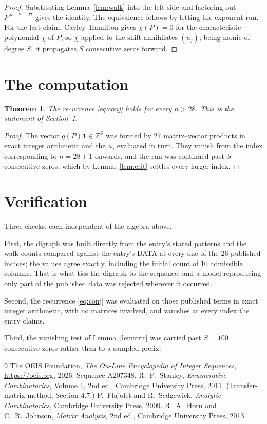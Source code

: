 \documentclass[11pt,a4paper]{article}
\theoremstyle{plain}
\newtheorem{theorem}{Theorem}
\theoremstyle{definition}
\begin{document}
\begin{proof}
Substituting Lemma~\ref{lem:walk} into the left side and factoring out
$P^{\,n-2-27}$ gives the identity. The equivalence follows by letting the exponent
run. For the last claim, Cayley--Hamilton gives $\chi(P)=0$ for the characteristic
polynomial $\chi$ of $P$, so $\chi$ applied to the shift annihilates $(u_j)$; being monic of
degree $S$, it propagates $S$ consecutive zeros forward.
\end{proof}

\section{The computation}

\begin{theorem}
The recurrence \eqref{eq:conj} holds for every $n>28$. This is the statement of
Section~1.
\end{theorem}

\begin{proof}
The vector $q(P)\mathbf{1}\in\mathbb{Z}^{S}$ was formed by $27$ matrix--vector
products in exact integer arithmetic and the $u_j$ evaluated in turn. They vanish from the
index corresponding to $n=28+1$ onwards, and the run was continued past $S$ consecutive
zeros, which by Lemma~\ref{lem:crit} settles every larger index.
\end{proof}

\section{Verification}

Three checks, each independent of the algebra above.

First, the digraph was built directly from the entry's stated patterns and the walk counts
compared against the entry's DATA at every one of the $26$ published indices; the
values agree exactly, including the initial count of $10$ admissible columns. That is
what ties the digraph to the sequence, and a model reproducing only part of the published
data was rejected wherever it occurred.

Second, the recurrence \eqref{eq:conj} was evaluated on those published terms in exact
integer arithmetic, with no matrices involved, and vanishes at every index the entry claims.

Third, the vanishing test of Lemma~\ref{lem:crit} was carried past $S=100$ consecutive
zeros rather than to a sampled prefix.

\begin{thebibliography}{9}
 The OEIS Foundation, \emph{The On-Line Encyclopedia of Integer
Sequences}, \url{https://oeis.org}, 2026. Sequence A207348.
 R.~P.~Stanley, \emph{Enumerative Combinatorics}, Volume 1, 2nd ed.,
Cambridge University Press, 2011. (Transfer-matrix method, Section 4.7.)
 P.~Flajolet and R.~Sedgewick, \emph{Analytic Combinatorics}, Cambridge
University Press, 2009.
 R.~A.~Horn and C.~R.~Johnson, \emph{Matrix Analysis}, 2nd ed., Cambridge
University Press, 2013.
\end{thebibliography}
\end{document}
